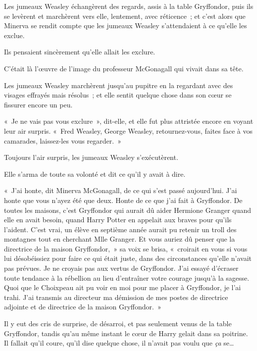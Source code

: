 Les jumeaux Weasley échangèrent des regards, assis à la table Gryffondor, puis ils se levèrent et marchèrent vers elle, lentement, avec réticence~; et c'est alors que Minerva se rendit compte que les jumeaux Weasley s'attendaient à ce qu'elle les exclue.

Ils pensaient sincèrement qu'elle allait les exclure.

C'était là l'œuvre de l'image du professeur McGonagall qui vivait dans sa tête.

Les jumeaux Weasley marchèrent jusqu'au pupitre en la regardant avec des visages effrayés mais résolus~; et elle sentit quelque chose dans son cœur se fissurer encore un peu.

«~Je ne vais pas vous exclure~», dit-elle, et elle fut plus attristée encore en voyant leur air surpris.
«~Fred Weasley, George Weasley, retournez-vous, faites face à vos camarades, laissez-les vous regarder.~»

Toujours l'air surpris, les jumeaux Weasley s'exécutèrent.

Elle s'arma de toute sa volonté et dit ce qu'il y avait à dire.

«~J'ai honte, dit Minerva McGonagall, de ce qui s'est passé aujourd'hui.
J'ai honte que vous n'ayez été que deux.
Honte de ce que j'ai fait à Gryffondor.
De toutes les maisons, c'est Gryffondor qui aurait dû aider Hermione Granger quand elle en avait besoin, quand Harry Potter en appelait aux braves pour qu'ils l'aident.
C'est vrai, un élève en septième année aurait pu retenir un troll des montagnes tout en cherchant Mlle Granger.
Et vous auriez dû penser que la directrice de la maison Gryffondor,~» sa voix se brisa, «~croirait en vous si vous lui désobéissiez pour faire ce qui était juste, dans des circonstances qu'elle n'avait pas prévues.
Je ne croyais pas aux vertus de Gryffondor.
J'ai essayé d'écraser toute tendance à la rébellion au lieu d'entraîner votre courage jusqu'à la sagesse.
Quoi que le Choixpeau ait pu voir en moi pour me placer à Gryffondor, je l'ai trahi.
J'ai transmis au directeur ma démission de mes postes de directrice adjointe et de directrice de la maison Gryffondor.~»

\later

Il y eut des cris de surprise, de désarroi, et pas seulement venus de la table Gryffondor, tandis qu'au même instant le cœur de Harry gelait dans sa poitrine.
Il fallait qu'il coure, qu'il dise quelque chose, il n'avait pas voulu que \emph{ça} se…

\later

